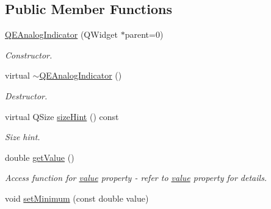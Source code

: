 \subsection*{Public Member Functions}
\begin{DoxyCompactItemize}
\item 
\hypertarget{classQEAnalogIndicator_a69e03d6236adcbb0574693bfe2bc9297}{
\hyperlink{classQEAnalogIndicator_a69e03d6236adcbb0574693bfe2bc9297}{QEAnalogIndicator} (QWidget $\ast$parent=0)}
\label{classQEAnalogIndicator_a69e03d6236adcbb0574693bfe2bc9297}

\begin{DoxyCompactList}\small\item\em Constructor. \end{DoxyCompactList}\item 
\hypertarget{classQEAnalogIndicator_a00ac395a5adf71c16f4a2e17ca75f4b9}{
virtual \hyperlink{classQEAnalogIndicator_a00ac395a5adf71c16f4a2e17ca75f4b9}{$\sim$QEAnalogIndicator} ()}
\label{classQEAnalogIndicator_a00ac395a5adf71c16f4a2e17ca75f4b9}

\begin{DoxyCompactList}\small\item\em Destructor. \end{DoxyCompactList}\item 
\hypertarget{classQEAnalogIndicator_ab837e1ec96e71a7c5677c5ff004fe0cc}{
virtual QSize \hyperlink{classQEAnalogIndicator_ab837e1ec96e71a7c5677c5ff004fe0cc}{sizeHint} () const }
\label{classQEAnalogIndicator_ab837e1ec96e71a7c5677c5ff004fe0cc}

\begin{DoxyCompactList}\small\item\em Size hint. \end{DoxyCompactList}\item 
\hypertarget{classQEAnalogIndicator_a8c56bd97ffb810a387ff17b82829befc}{
double \hyperlink{classQEAnalogIndicator_a8c56bd97ffb810a387ff17b82829befc}{getValue} ()}
\label{classQEAnalogIndicator_a8c56bd97ffb810a387ff17b82829befc}

\begin{DoxyCompactList}\small\item\em Access function for \hyperlink{classQEAnalogIndicator_ad6440740a8cf86c832157ba7930b48b0}{value} property -\/ refer to \hyperlink{classQEAnalogIndicator_ad6440740a8cf86c832157ba7930b48b0}{value} property for details. \end{DoxyCompactList}\item 
\hypertarget{classQEAnalogIndicator_a134a1abb19567eb950bdc831ea18f50e}{
void \hyperlink{classQEAnalogIndicator_a134a1abb19567eb950bdc831ea18f50e}{setMinimum} (const double value)}
\label{classQEAnalogIndicator_a134a1abb19567eb950bdc831ea18f50e}


\end{DoxyCompactItemize}
